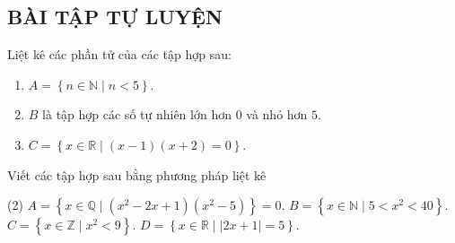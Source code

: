 \subsection{BÀI TẬP TỰ LUYỆN}
\begin{bt}%
	Liệt kê các phần tử của các tập hợp sau:
	\begin{enumerate}
		\item $A=\left\lbrace n\in \mathbb{N} \mid n<5\right\rbrace$.
		\item $B$ là tập hợp các số tự nhiên lớn hơn $0$ và nhỏ hơn $5$.
		\item $C=\left\lbrace x\in \mathbb{R}\mid (x-1)(x+2)=0\right\rbrace$.
	\end{enumerate}
\end{bt}
\begin{bt}%
	Viết các tập hợp sau bằng phương pháp liệt kê
	\begin{tasks}(2)
		\task $A=\left\lbrace  x\in \mathbb{Q}\mid (x^2-2x+1)(x^2-5)\right\rbrace=0$.
		\task $B=\left\lbrace x \in \mathbb{N}\mid 5<x^2<40\right\rbrace$.
		\task $C=\left\lbrace x\in \mathbb{Z}\mid x^2<9\right\rbrace$.
		\task $D=\left\lbrace x\in \mathbb{R}\mid \left|2x+1\right|=5\right\rbrace$.
	\end{tasks}
\end{bt}
